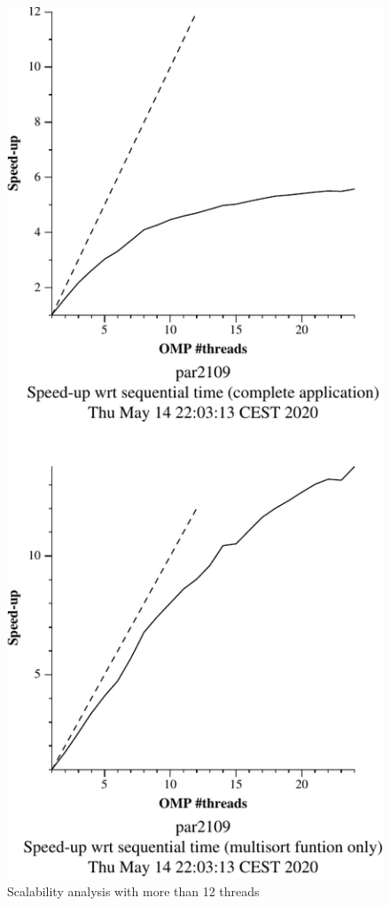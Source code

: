 \begin{figure}[H]
\begin{minipage}{0.5\textwidth}
        \includegraphics[width=0.7\linewidth]{plots/new-omp-tree-cutoff-24-crop.pdf}
        \caption{Scalability analysis with more than 12 threads}
        \label{fig:cutoff24} 
    \end{minipage}
\end{figure}


